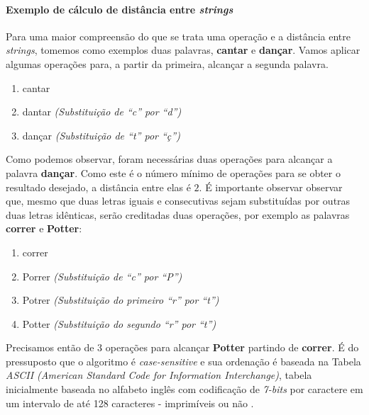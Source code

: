 \paragraph*{Exemplo de cálculo de distância entre \textit{strings}} %
\label{sub:exemplo_de_c_lculo_de_distancia_entre_it}

Para uma maior compreensão do que se trata uma operação e a distância entre \textit{strings}, tomemos como exemplos duas palavras, \textbf{cantar} e \textbf{dançar}. Vamos aplicar algumas operações para, a partir da primeira, alcançar a segunda palavra.


\begin{enumerate}[start=0]
	\item cantar
	\item dantar \textit{(Substituição de ``c'' por ``d'')}
	\item dançar \textit{(Substituição de ``t'' por ``ç'')}
\end{enumerate}

Como podemos observar, foram necessárias duas operações para alcançar a palavra \textbf{dançar}. Como este é o número mínimo de operações para se obter o resultado desejado, a distância entre elas é $2$.
É importante observar observar que, mesmo que duas letras iguais e consecutivas sejam substituídas por outras duas letras idênticas, serão creditadas duas operações, por exemplo as palavras \textbf{correr} e \textbf{Potter}:

\begin{enumerate}[start=0]
	\item correr
	\item Porrer \textit{(Substituição de ``c'' por ``P'')}
	\item Potrer \textit{(Substituição do primeiro ``r'' por ``t'')}
	\item Potter \textit{(Substituição do segundo ``r'' por ``t'')}
\end{enumerate}

Precisamos então de 3 operações para alcançar \textbf{Potter} partindo de \textbf{correr}. É do pressuposto que o algoritmo é \textit{case-sensitive} e sua ordenação é baseada na Tabela \textit{ASCII (American Standard Code for Information Interchange)}, tabela inicialmente baseada no alfabeto inglês com codificação de \textit{7-bits} por caractere em um intervalo de até 128 caracteres - imprimíveis ou não \cite{shirey2007rfc}.


